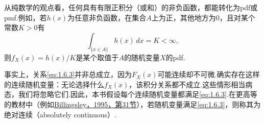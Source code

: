 
从纯数学的观点看，任何具有有限正积分（或和）的非负函数，都能转化为pdf或pmf.例如，若$h(x)$为任意非负函数，在集合$A$上为正，其他地方为0，且对某个常数$K>0$有
$$\int_{\{x\in A\}}h(x)\,dx=K<\infty,$$
则$f_X(x)=h(x)/K$是某个取值于$A$的随机变量$X$的pdf.

事实上，关系\eqref{eq:1.6.3}并非总成立，因为$F_X(x)$可能连续却不可微.确实存在这样的连续随机变量：无论选择什么$f_X(x)$，该积分关系都不成立.这些情形相当病态，我们将忽略它们.因此，本书假设每个连续随机变量都满足\eqref{eq:1.6.3}.在更高等的教材中（例如\hyperref[bib:source33]{Billingsley，1995，第31节}），若随机变量满足\eqref{eq:1.6.3}，则称其为绝对连续（absolutely continuous）.
